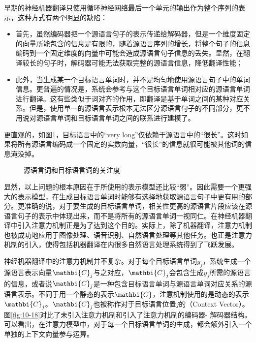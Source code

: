 \parinterval 早期的神经机器翻译只使用循环神经网络最后一个单元的输出作为整个序列的表示，这种方式有两个明显的缺陷：

\begin{itemize}
\vspace{0.5em}
\item 首先，虽然编码器把一个源语言句子的表示传递给解码器，但是一个维度固定的向量所能包含的信息是有限的，随着源语言序列的增长，将整个句子的信息编码到一个固定维度的向量中可能会造成源语言句子信息的丢失。显然，在翻译较长的句子时，解码器可能无法获取完整的源语言信息，降低翻译性能；
\vspace{0.5em}
\item 此外，当生成某一个目标语言单词时，并不是均匀地使用源语言句子中的单词信息。更普遍的情况是，系统会参考与这个目标语言单词相对应的源语言单词进行翻译。这有些类似于词对齐的作用，即翻译是基于单词之间的某种对应关系。但是，使用单一的源语言表示根本无法区分源语言句子的不同部分，更不用说对源语言单词和目标语言单词之间的联系进行建模了。
\vspace{0.5em}
\end{itemize}

\parinterval 更直观的，如图\ref{fig:10-17}，目标语言中的“very long”仅依赖于源语言中的“很长”。这时如果将所有源语言编码成一个固定的实数向量，“很长”的信息就很可能被其他词的信息淹没掉。

\begin{figure}[htp]
\centering

\caption{源语言词和目标语言词的关注度}
\label{fig:10-17}
\end{figure}

\parinterval 显然，以上问题的根本原因在于所使用的表示模型还比较“弱”。因此需要一个更强大的表示模型，在生成目标语言单词时能够有选择地获取源语言句子中更有用的部分。更准确的说，对于要生成的目标语言单词，相关性更高的源语言片段应该在源语言句子的表示中体现出来，而不是将所有的源语言单词一视同仁。在神经机器翻译中引入注意力机制正是为了达到这个目的。实际上，除了机器翻译，注意力机制也被成功地应用于图像处理、语音识别、自然语言处理等其他任务。也正是注意力机制的引入，使得包括机器翻译在内很多自然语言处理系统得到了飞跃发展。

\parinterval 神经机器翻译中的注意力机制并不复杂。对于每个目标语言单词$y_j$，系统生成一个源语言表示向量$\mathbi{C}_j$与之对应，$\mathbi{C}_j$会包含生成$y_j$所需的源语言的信息，或者说$\mathbi{C}_j$是一种包含目标语言单词与源语言单词对应关系的源语言表示。不同于用一个静态的表示$\mathbi{C}$，注意机制使用的是动态的表示$\mathbi{C}_j$。$\mathbi{C}_j$也被称作对于目标语言位置$j$的{\small{}}（Context Vector）。图\ref{fig:10-18}对比了未引入注意力机制和引入了注意力机制的编码器- 解码器结构。可以看出，在注意力模型中，对于每一个目标语言单词的生成，都会额外引入一个单独的上下文向量参与运算。


